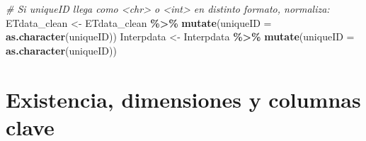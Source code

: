 \documentclass[
]{article}
\newenvironment{Shaded}{\begin{snugshade}}{\end{snugshade}}
\newcommand{\AttributeTok}[1]{\textcolor[rgb]{0.13,0.29,0.53}{#1}}
\newcommand{\CommentTok}[1]{\textcolor[rgb]{0.56,0.35,0.01}{\textit{#1}}}
\newcommand{\FunctionTok}[1]{\textcolor[rgb]{0.13,0.29,0.53}{\textbf{#1}}}
\newcommand{\NormalTok}[1]{#1}
\newcommand{\OtherTok}[1]{\textcolor[rgb]{0.56,0.35,0.01}{#1}}
\newcommand{\SpecialCharTok}[1]{\textcolor[rgb]{0.81,0.36,0.00}{\textbf{#1}}}
\begin{document}
\begin{Shaded}
\begin{Highlighting}[]
\CommentTok{\# Si uniqueID llega como \textless{}chr\textgreater{} o \textless{}int\textgreater{} en distinto formato, normaliza:}
\NormalTok{ETdata\_clean }\OtherTok{\textless{}{-}}\NormalTok{ ETdata\_clean }\SpecialCharTok{\%\textgreater{}\%} \FunctionTok{mutate}\NormalTok{(}\AttributeTok{uniqueID =} \FunctionTok{as.character}\NormalTok{(uniqueID))}
\NormalTok{Interpdata   }\OtherTok{\textless{}{-}}\NormalTok{ Interpdata   }\SpecialCharTok{\%\textgreater{}\%} \FunctionTok{mutate}\NormalTok{(}\AttributeTok{uniqueID =} \FunctionTok{as.character}\NormalTok{(uniqueID))}
\end{Highlighting}
\end{Shaded}

\section{Existencia, dimensiones y columnas
clave}\label{existencia-dimensiones-y-columnas-clave}
\end{document}
